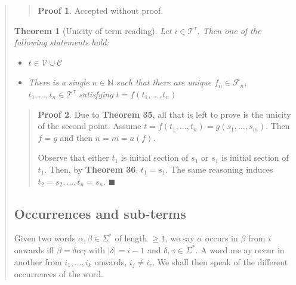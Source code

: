 \documentclass[a4paper, 12pt]{article}
\newtheorem{theorem}{Theorem}
\theoremstyle{definition}
\theoremstyle{definition}
\theoremstyle{definition}
\newtheorem{pro}{Proof}
\begin{document}
\begin{quote}
\small
\begin{quote}

\begin{pro}
    Accepted without proof.
\end{pro}

\end{quote}
\normalsize

\begin{theorem}[Unicity of term reading]
    Let $i \in \mathcal{T}^{\tau}$. Then one of the following statements 
    hold: 

    \begin{itemize}
        \item $t \in \mathcal{V} \cup \mathcal{C}$
        \item There is a single $n \in \mathbb{N}$ such that 
            there are unique $f_n \in \mathcal{F}_n$,
            $t_1, \ldots, t_n \in \mathcal{T}^{\tau}$ satisfying
            $t = f(t_1, \ldots, t_n)$
    \end{itemize}
\end{theorem}


\small
\begin{quote}

\begin{pro}
    Due to \textbf{Theorem 35}, all that is left to prove is the unicity of the
    second point. Assume $t = f(t_1, \ldots, t_n) = g(s_1, \ldots, s_m)$. Then
    $f = g$ and then $n = m = a(f)$. 

    Observe that either $t_1$ is initial section of $s_1$ or 
    $s_1$ is initial section of $t_1$. Then, by \textbf{Theorem 36},
    $t_1 = s_1$. The same reasoning induces $t_2 = s_2, \ldots, t_n = s_n$. 
    $\blacksquare$
\end{pro}

\end{quote}
\normalsize


\subsection{Occurrences and sub-terms}

Given two words $\alpha, \beta \in \Sigma^{*}$ of length $\geq 1$, we say
$\alpha$ occurs in $\beta$ from $i$ onwards iff $\beta = \delta \alpha \gamma$
with $|\delta| = i - 1$ and $\delta, \gamma \in \Sigma^{*}$. A word me ay occur
in another from $i_1, \ldots, i_k$ onwards, $i_j \neq i_r$. We shall then speak
of the different occurrences of the word.


\end{quote}
\end{document}
